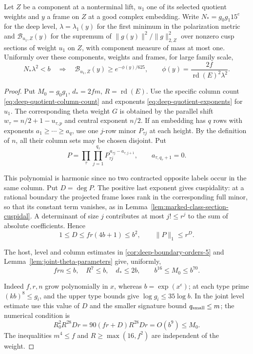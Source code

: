 \begin{auxlemma}
\label{lem:deep-thin-evaluation}
Let \(Z\) be a component at a nonterminal lift, \(u_1\) one of its
selected quotient weights and \(y\) a frame on \(Z\) at a good
complex embedding. Write \(N_*=g_0g_1 15^e\) for the deep level,
\(\lambda=\lambda_1(y)\) for the first minimum in the polarization
metric and \(\mathcal B_{u_1,Z}(y)\) for the supremum of
\(\|g(y)\|^2/\|g\|_{2,Z}^2\) over nonzero cusp sections of weight
\(u_1\) on \(Z\), with component measure of mass at most one. Uniformly
over these components, weights and frames, for large family scale,
\[
 N_*\lambda^2<b\quad\Longrightarrow\quad
 \mathcal B_{u_1,Z}(y)\ge e^{-\phi(y)/625},\qquad
 \phi(y)=\frac{2f}{\operatorname{rd}(E)^2\lambda^2}.
\]
\end{auxlemma}
\begin{proof}
Put \(M_0=g_0g_1\), \(d_*=2fm\), \(R=\operatorname{rd}(E)\).
Use the specific column count \eqref{eq:deep-quotient-column-count} and exponents \eqref{eq:deep-quotient-exponents} for \(u_1\). The
corresponding theta weight \(G\) is obtained by the parallel shift \(w_\tau=n/2+1-u_{\tau,p}\) and central exponent \(n/2\). If an embedding
has \(q\) rows with exponents \(a_1\ge\cdots\ge a_q\), use one
\(j\)-row minor \(P_{\tau j}\) at each height. By the definition of
\(n\), all their column sets may be chosen disjoint. Put
\[
 P=\prod_{\tau}\prod_{j=1}^{q_\tau}
          P_{\tau j}^{\,a_{\tau j}-a_{\tau,j+1}},
 \qquad a_{\tau,q_\tau+1}=0 .
\]

This polynomial is harmonic since no two contracted opposite labels occur in
the same column. Put \(D=\deg P\). The positive last exponent gives
cuspidality: at a rational boundary the projected frame loses rank
in the corresponding full minor, so that its constant term vanishes,
as in Lemma~\ref{lem:marked-class-section-cuspidal}. A determinant
of size \(j\) contributes at most \(j!\le r^j\) to the sum of
absolute coefficients. Hence
\[
 1\le D\le fr(4b+1)\le b^2,\qquad \|P\|_1\le r^D .
\]

The host, level and column estimates in
\ref{cor:deep-boundary-orders-5} and
Lemma~\ref{lem:joint-theta-parameters} give, uniformly,
\[
 frn\le b,\quad R^7\le b,\quad d_*\le2b,
 \qquad b^{16}\le M_0\le b^{70}.
\]

Indeed \(f,r,n\) grow polynomially in \(x\), whereas
\(b=\exp(x^\epsilon)\); at each type prime
\((kb)^8\le g_i\), and the upper type bounds give
\(\log g_i\le35\log b\). In the joint level estimate use this
value of \(D\) and the smaller signature bound \(q_{\rm small}\le m\);
the numerical condition is
\[
 R_0^2R^{28}Dr=90(fr+D)R^{28}Dr=O(b^9)\le M_0 .
\]
The inequalities \(m^4\le f\) and \(R\ge\max(16,f^2)\) are independent of the weight.


\end{proof}
